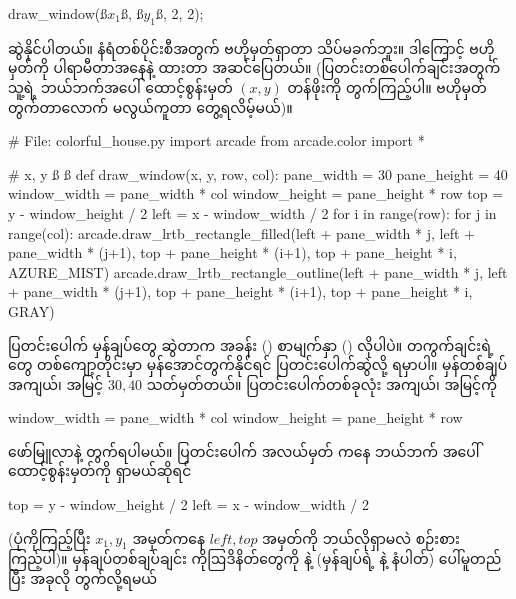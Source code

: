 %
\begin{py}
draw_window(ß$x_1$ß, ß$y_1$ß, 2, 2);
\end{py}
%
ဆွဲနိုင်ပါတယ်။ နံရံတစ်ပိုင်းစီအတွက် ဗဟိုမှတ်ရှာတာ သိပ်မခက်ဘူး။ ဒါကြောင့် ဗဟိုမှတ်ကို ပါရာမီတာအနေနဲ့ ထားတာ အဆင်ပြေတယ်။ (ပြတင်းတစ်ပေါက်ချင်းအတွက်  သူ့ရဲ့ ဘယ်ဘက်အပေါ် ထောင့်\allowbreak စွန်းမှတ် $(x,y)$ တန်ဖိုးကို တွက်ကြည့်ပါ။ ဗဟိုမှတ်တွက်တာလောက် မလွယ်ကူတာ တွေ့ရလိမ့်မယ်)။ 

%
\begin{py}
# File: colorful_house.py
import arcade
from arcade.color import *

# x, y ß  ß
def draw_window(x, y, row, col):
    pane_width = 30
    pane_height = 40
    window_width = pane_width * col
    window_height = pane_height * row
    top = y - window_height / 2
    left = x - window_width / 2
    for i in range(row):
        for j in range(col):
            arcade.draw_lrtb_rectangle_filled(left + pane_width * j,
                                              left + pane_width * (j+1),
                                              top + pane_height * (i+1),
                                              top + pane_height * i,
                                              AZURE_MIST)
            arcade.draw_lrtb_rectangle_outline(left + pane_width * j,
                                               left + pane_width * (j+1),
                                               top + pane_height * (i+1),
                                               top + pane_height * i,
                                               GRAY)
\end{py}
%
ပြတင်းပေါက် မှန်ချပ်တွေ ဆွဲတာက အခန်း (\fRefNo{\ref{ch:ch07ctlstmt}}) စာမျက်နှာ (\fRefNo{\pageref{lst:checkerboard}})  လိုပါပဲ။ တကွက်ချင်းရဲ့  တွေ  တစ်ကျော့တိုင်းမှာ မှန်အောင်တွက်နိုင်ရင် ပြတင်းပေါက်ဆွဲလို့ ရမှာပါ။ မှန်တစ်ချပ် အကျယ်၊ အမြင့် $30, 40$ သတ်မှတ်တယ်။ ပြတင်းပေါက်တစ်ခုလုံး အကျယ်၊ အမြင့်ကို
\begin{codetxt}
window_width = pane_width * col
window_height = pane_height * row
\end{codetxt}
ဖော်မြူလာနဲ့ တွက်ရပါမယ်။ ပြတင်းပေါက် အလယ်မှတ်  ကနေ ဘယ်ဘက် အပေါ်ထောင့်စွန်းမှတ်ကို ရှာမယ်ဆိုရင်
\begin{codetxt}
top = y - window_height / 2
left = x - window_width / 2
\end{codetxt}
(ပုံကိုကြည့်ပြီး $x_1, y_1$ အမှတ်ကနေ $left, top$ အမှတ်ကို ဘယ်လိုရှာမလဲ စဉ်းစားကြည့်ပါ)။ မှန်ချပ်တစ်ချပ်ချင်း ကိုဩဒိနိတ်တွေကို  နဲ့   (မှန်ချပ်ရဲ့  နဲ့  နံပါတ်) ပေါ်မူတည်ပြီး အခုလို တွက်လို့ရမယ်

